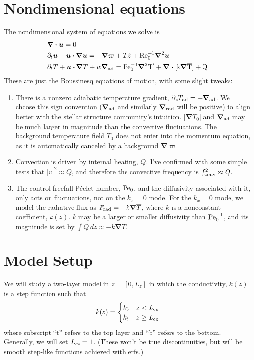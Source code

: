 \documentclass[12pt,preprint]{article}
\renewcommand{\vec}[1]{\boldsymbol{#1}}
\renewcommand{\dot}{\vec{\cdot}}
\newcommand{\grad}{\vec{\nabla}}
\begin{document}
\section{Nondimensional equations}
The nondimensional system of equations we solve is
\begin{align}
&\grad\dot\vec{u} = 0 \\
&\partial_t \vec{u} + \vec{u}\dot\grad\vec{u} = -\grad \varpi + T \hat{z} + \rm{Re}_0^{-1}\grad^2 \vec{u} \\
&\partial_t T + \vec{u}\dot\grad T + w \grad_{\rm{ad}} = \rm{Pe}_0^{-1}\grad^2 T' + \grad\dot[k \grad \overline{T}] + Q
\end{align}
These are just the Boussinesq equations of motion, with some slight tweaks:
\begin{enumerate}
\item There is a nonzero adiabatic temperature gradient, $\partial_z T_{\rm{ad}} = -\grad_{\rm{ad}}$.
We choose this sign convention ($\grad_{\rm{ad}}$ and similarly $\grad_{\rm{rad}}$ will be positive) to align better with the stellar structure community's intuition.
$|\grad T_0|$ and $\grad_{\rm{ad}}$ may be much larger in magnitude than the convective fluctuations.
The background temperature field $T_0$ does not enter into the momentum equation, as it is automatically canceled by a background $\grad \varpi$.
\item Convection is driven by internal heating, $Q$.
I've confirmed with some simple tests that $|u|^2 \approx Q$, and therefore the convective frequency is $f_{\rm{conv}}^2 \approx Q$.
\item The control freefall P\'{e}clet number, $\rm{Pe}_0$, and the diffusivity associated with it, only acts on fluctuations, not on the $k_x = 0$ mode.
For the $k_x = 0$ mode, we model the radiative flux as $F_{\rm{rad}} = -k \grad \overline{T}$, where $k$ is a nonconstant coefficient, $k(z)$.
$k$ may be a larger or smaller diffusivity than $\rm{Pe}_0^{-1}$, and its magnitude is set by $\int Q\, dz \approx -k \grad\overline{T}$.
\end{enumerate}


\section{Model Setup}
We will study a two-layer model in $z = [0, L_z]$ in which the conductivity, $k(z)$ is a step function such that
\begin{equation}
k(z) = \begin{cases}
k_b & z < L_{\rm{cz}} \\
k_t & z \geq L_{\rm{cz}}
\end{cases}
\end{equation}
where subscript ``t'' refers to the top layer and ``b'' refers to the bottom.
Generally, we will set $L_{\rm{cz}} = 1$.
(These won't be true discontinuities, but will be smooth step-like functions achieved with erfs.)
\end{document}
